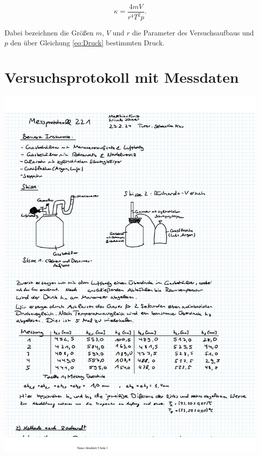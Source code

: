 \documentclass{article}
\begin{document}
\begin{equation}
    \kappa = \frac{4mV}{r^4 T^2 p}.
    \label{eq:Rü_Kappa}
\end{equation}

Dabei bezeichnen die Größen $m$, $V$ und $r$ die Parameter des Versuchsaufbaus und $p$ den über Gleichung \ref{eq:Druck} bestimmten Druck. 

\newpage

\section{Versuchsprotokoll mit Messdaten}

\includegraphics[width=\textwidth]{graphics/mess1.jpg}
\newpage
\end{document}
